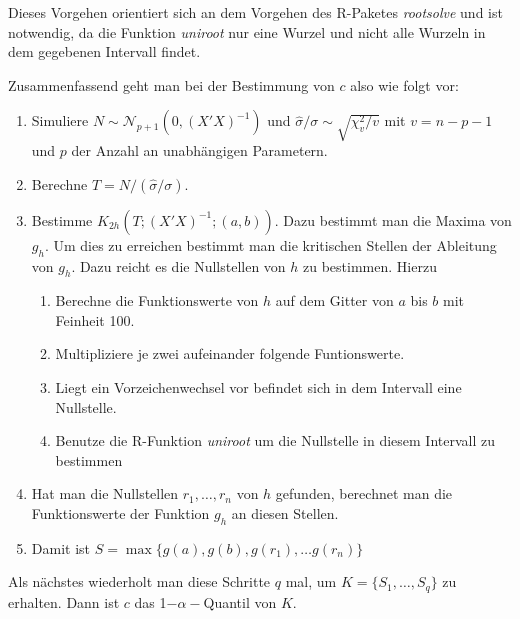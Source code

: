 \documentclass[12pt,a4paper]{article}
\theoremstyle{definition}
\theoremstyle{definition}
\theoremstyle{definition}
\theoremstyle{definition}
\newcommand{\ngridpoly}{100}
\begin{document}
Dieses Vorgehen orientiert sich an dem Vorgehen des R-Paketes \textit{rootsolve} und ist notwendig, da die Funktion \textit{uniroot} nur eine Wurzel und nicht alle Wurzeln in dem gegebenen Intervall findet.

Zusammenfassend geht man bei der Bestimmung von $c$ also wie folgt vor:

\begin{enumerate}
\item Simuliere $N \sim \mathscr{N}_{p+1}(0,(X'X)^{-1})$ und $\hat{\sigma}/\sigma \sim \sqrt{\chi^2_v /v}$ mit $v=n-p-1$ und $p$ der Anzahl an unabhängigen Parametern.
\item Berechne $T=N/ (\hat{\sigma}/\sigma)$.
\item Bestimme $K_{2h}(T;(X'X)^{-1};(a,b))$. Dazu bestimmt man die Maxima von $g_h$. Um dies zu erreichen bestimmt man die kritischen Stellen der Ableitung von $g_h$. Dazu reicht es die Nullstellen von $h$ zu bestimmen. Hierzu
\begin{enumerate}
\item Berechne die Funktionswerte von $h$ auf dem Gitter von $a$ bis $b$ mit Feinheit \ngridpoly .
\item Multipliziere je zwei aufeinander folgende Funtionswerte.
\item Liegt ein Vorzeichenwechsel vor befindet sich in dem Intervall eine Nullstelle.
\item Benutze die R-Funktion \textit{uniroot} um die Nullstelle in diesem Intervall zu bestimmen
\end{enumerate}
\item Hat man die Nullstellen $r_1, \ldots, r_n$ von $h$ gefunden, berechnet man die Funktionswerte der Funktion $g_h$ an diesen Stellen.
\item Damit ist $S = \max\{ g(a), g(b), g(r_1), \ldots g(r_n) \}$
\end{enumerate}

Als nächstes wiederholt man diese Schritte $q$ mal, um $K= \{S_1, \ldots, S_q\}$ zu erhalten. Dann ist $c$ das 1$-\alpha-$Quantil von $K$.
\end{document}
